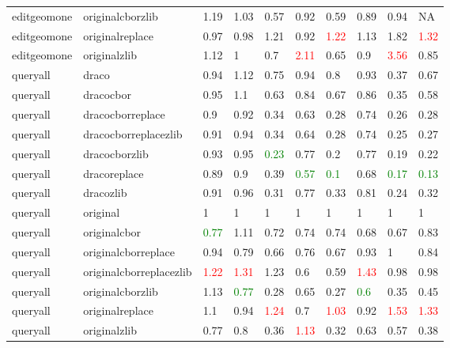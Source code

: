 \begin{landscape}
\begin{longtable}{llllllllll}
\rowcolor{lightgray}  editgeomone & originalcborzlib & 1.19 & 1.03 & 0.57 & 0.92 & 0.59 & 0.89 & 0.94 & NA\\
\rowcolor{lightgray}  editgeomone & originalreplace & 0.97 & 0.98 & 1.21 & 0.92 & \textcolor{red}{1.22} & 1.13 & 1.82 & \textcolor{red}{1.32}\\
\rowcolor{lightgray}  editgeomone & originalzlib & 1.12 & 1 & 0.7 & \textcolor{red}{2.11} & 0.65 & 0.9 & \textcolor{red}{3.56} & 0.85\\
\rowcolor{lightgray}  queryall & draco & 0.94 & 1.12 & 0.75 & 0.94 & 0.8 & 0.93 & 0.37 & 0.67\\
\rowcolor{lightgray}  queryall & dracocbor & 0.95 & 1.1 & 0.63 & 0.84 & 0.67 & 0.86 & 0.35 & 0.58\\
\rowcolor{lightgray}  queryall & dracocborreplace & 0.9 & 0.92 & 0.34 & 0.63 & 0.28 & 0.74 & 0.26 & 0.28\\
\rowcolor{lightgray}  queryall & dracocborreplacezlib & 0.91 & 0.94 & 0.34 & 0.64 & 0.28 & 0.74 & 0.25 & 0.27\\
\rowcolor{lightgray}  queryall & dracocborzlib & 0.93 & 0.95 & \textcolor{green}{0.23} & 0.77 & 0.2 & 0.77 & 0.19 & 0.22\\
\rowcolor{lightgray}  queryall & dracoreplace & 0.89 & 0.9 & 0.39 & \textcolor{green}{0.57} & \textcolor{green}{0.1} & 0.68 & \textcolor{green}{0.17} & \textcolor{green}{0.13}\\
\rowcolor{lightgray}  queryall & dracozlib & 0.91 & 0.96 & 0.31 & 0.77 & 0.33 & 0.81 & 0.24 & 0.32\\
queryall & original & 1 & 1 & 1 & 1 & 1 & 1 & 1 & 1\\
queryall & originalcbor & \textcolor{green}{0.77} & 1.11 & 0.72 & 0.74 & 0.74 & 0.68 & 0.67 & 0.83\\
queryall & originalcborreplace & 0.94 & 0.79 & 0.66 & 0.76 & 0.67 & 0.93 & 1 & 0.84\\
queryall & originalcborreplacezlib & \textcolor{red}{1.22} & \textcolor{red}{1.31} & 1.23 & 0.6 & 0.59 & \textcolor{red}{1.43} & 0.98 & 0.98\\
queryall & originalcborzlib & 1.13 & \textcolor{green}{0.77} & 0.28 & 0.65 & 0.27 & \textcolor{green}{0.6} & 0.35 & 0.45\\
queryall & originalreplace & 1.1 & 0.94 & \textcolor{red}{1.24} & 0.7 & \textcolor{red}{1.03} & 0.92 & \textcolor{red}{1.53} & \textcolor{red}{1.33}\\
queryall & originalzlib & 0.77 & 0.8 & 0.36 & \textcolor{red}{1.13} & 0.32 & 0.63 & 0.57 & 0.38\\

\end{longtable}
\end{landscape}
